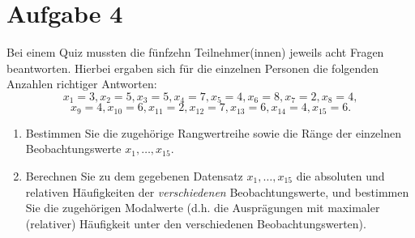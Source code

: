 \documentclass{exercise}
\begin{document}
    \section*{Aufgabe 4}

    \begin{problem}
        Bei einem Quiz mussten die fünfzehn Teilnehmer(innen) jeweils acht Fragen beantworten.
        Hierbei ergaben sich für die einzelnen Personen die folgenden Anzahlen richtiger Antworten:
        \[
            x_1 = 3, x_2 = 5, x_3 = 5, x_4 = 7, x_5 = 4, x_6 = 8, x_7 = 2, x_8 = 4,
        \]
        \[
            x_9 = 4, x_{10} = 6, x_{11} = 2, x_{12} = 7, x_{13} = 6, x_{14} = 4, x_{15} = 6.
        \]
        \begin{enumerate}
            \item Bestimmen Sie die zugehörige Rangwertreihe sowie die Ränge der einzelnen Beobachtungswerte \(x_1, \ldots, x_{15}\).
            \item Berechnen Sie zu dem gegebenen Datensatz \(x_1, \ldots, x_{15}\) die absoluten und relativen Häufigkeiten der \emph{verschiedenen} Beobachtungswerte, und bestimmen Sie die zugehörigen Modalwerte (d.h. die Ausprägungen mit maximaler (relativer) Häufigkeit unter den verschiedenen Beobachtungswerten).
        \end{enumerate}
    \end{problem}
\end{document}

